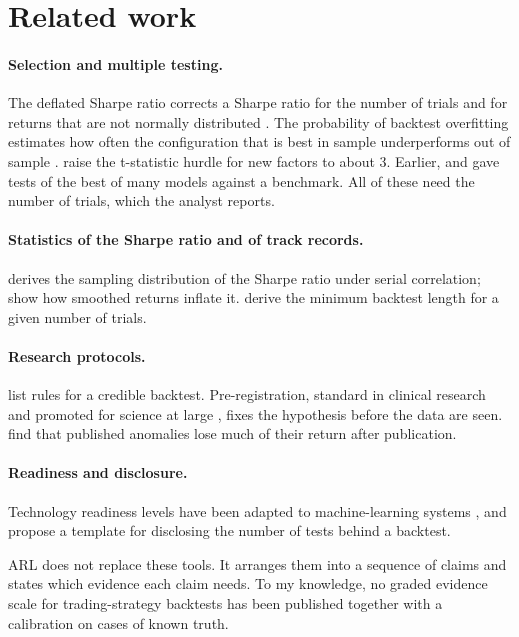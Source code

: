 \documentclass[11pt]{article}
\begin{document}
\section{Related work}

\paragraph{Selection and multiple testing.} The deflated Sharpe ratio corrects a Sharpe ratio for the number of trials
and for returns that are not normally distributed \citep{bailey2014deflated}. The probability of backtest overfitting
estimates how often the configuration that is best in sample underperforms out of sample \citep{bailey2017pbo}.
\citet{harvey2016cross} raise the t-statistic hurdle for new factors to about 3. Earlier, \citet{white2000reality} and
\citet{hansen2005spa} gave tests of the best of many models against a benchmark. All of these need the number of trials,
which the analyst reports.

\paragraph{Statistics of the Sharpe ratio and of track records.} \citet{lo2002sharpe} derives the sampling distribution
of the Sharpe ratio under serial correlation; \citet{getmansky2004} show how smoothed returns inflate it.
\citet{bailey2014pseudo} derive the minimum backtest length for a given number of trials.

\paragraph{Research protocols.} \citet{arnott2019backtesting} list rules for a credible backtest. Pre-registration,
standard in clinical research and promoted for science at large \citep{nosek2018prereg}, fixes the hypothesis before the
data are seen. \citet{mclean2016} find that published anomalies lose much of their return after publication.

\paragraph{Readiness and disclosure.} Technology readiness levels have been adapted to machine-learning systems
\citep{lavin2022mltrl}, and \citet{fabozzi2018honest} propose a template for disclosing the number of tests behind a
backtest.

ARL does not replace these tools. It arranges them into a sequence of claims and states which evidence each claim
needs. To my knowledge, no graded evidence scale for trading-strategy backtests has been published together with a
calibration on cases of known truth.
\end{document}
